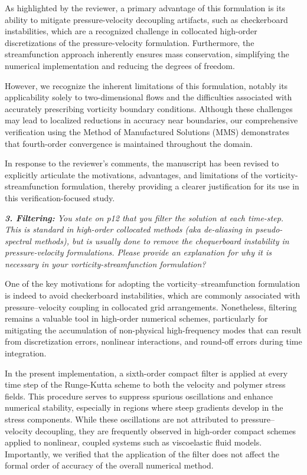 \documentclass[12pt]{article}
\begin{document}
As highlighted by the reviewer, a primary advantage of this formulation is its ability to mitigate pressure-velocity decoupling artifacts, such as checkerboard instabilities, which are a recognized challenge in collocated high-order discretizations of the pressure-velocity formulation. Furthermore, the streamfunction approach inherently ensures mass conservation, simplifying the numerical implementation and reducing the degrees of freedom.

However, we recognize the inherent limitations of this formulation, notably its applicability solely to two-dimensional flows and the difficulties associated with accurately prescribing vorticity boundary conditions. Although these challenges may lead to localized reductions in accuracy near boundaries, our comprehensive verification using the Method of Manufactured Solutions (MMS) demonstrates that fourth-order convergence is maintained throughout the domain.

In response to the reviewer’s comments, the manuscript has been revised to explicitly articulate the motivations, advantages, and limitations of the vorticity-streamfunction formulation, thereby providing a clearer justification for its use in this verification-focused study.

\vspace{3mm}
{\it \textbf{3. Filtering:} You state on p12 that you filter the solution at each time-step. This is standard in high-order collocated methods (aka de-aliasing in pseudo-spectral methods), but is usually done to remove the chequerboard instability in pressure-velocity formulations. Please provide an explanation for why it is necessary in your vorticity-streamfunction formulation?}
\vspace{3mm}

One of the key motivations for adopting the vorticity–streamfunction formulation is indeed to avoid checkerboard instabilities, which are commonly associated with pressure–velocity coupling in collocated grid arrangements. Nonetheless, filtering remains a valuable tool in high-order numerical schemes, particularly for mitigating the accumulation of non-physical high-frequency modes that can result from discretization errors, nonlinear interactions, and round-off errors during time integration.

In the present implementation, a sixth-order compact filter is applied at every time step of the Runge-Kutta scheme to both the velocity and polymer stress fields. This procedure serves to suppress spurious oscillations and enhance numerical stability, especially in regions where steep gradients develop in the stress components. While these oscillations are not attributed to pressure–velocity decoupling, they are frequently observed in high-order compact schemes applied to nonlinear, coupled systems such as viscoelastic fluid models. Importantly, we verified that the application of the filter does not affect the formal order of accuracy of the overall numerical method.
\end{document}
